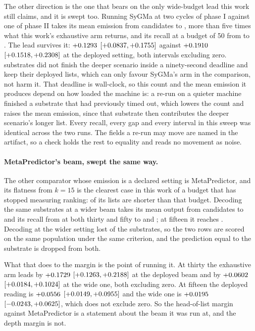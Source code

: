 \documentclass[journal=jcisd8,manuscript=suppinfo,layout=onecolumn]{achemso}
\begin{document}
The other direction is the one that bears on the only wide-budget lead this work still claims, and
it is swept too. Running SyGMa at two cycles of phase I against one of phase II takes its mean
emission from \numSygscenDeployedemitted{} candidates to \numSygscenDeepemitted{}, more than five
times what this work's exhaustive arm returns, and its recall at a budget of 50 from
\numSweepSygmaFiveZero{} to \numSygscenDeeprecall. The lead survives it:
$+0.1293$ $[+0.0837, +0.1755]$ against
$+0.1910$ $[+0.1518, +0.2308]$ at the deployed
setting, both intervals excluding zero. \numSygscenUnfinished{} substrates did not finish the
deeper scenario inside a ninety-second deadline and keep their deployed lists, which can only
favour SyGMa's arm in the comparison, not harm it. That deadline is wall-clock, so this
count and the mean emission it produces depend on how loaded the machine is: a re-run on a quieter
machine finished a substrate that had previously timed out, which lowers the count and raises the
mean emission, since that substrate then contributes the deeper scenario's longer list. Every
recall, every gap and every interval in this sweep was identical across the two runs. The fields a
re-run may move are named in the artifact, so a check holds the rest to equality and
reads no movement as noise.

\paragraph{MetaPredictor's beam, swept the same way.} The other comparator whose emission is a
declared setting is MetaPredictor, and its flatness from $k=15$ is the clearest case in this work of
a budget that has stopped measuring ranking: \numShortMetapredictorOneFive{} of its
\numPopulationN{} lists are shorter than that budget. Decoding the same substrates at a wider beam
takes its mean output from \numMpbeamDeployedemitted{} candidates to \numMpbeamWideemitted{} and
its recall from \numSweepMetapredictorThreeZero{} at both thirty and fifty to
\numMpbeamWiderecallThreeZero{} and \numMpbeamWiderecallFiveZero{}; at fifteen it reaches
\numMpbeamWiderecallOneFive{}. Decoding at the wider setting lost \numMpbeamWidemissingWord{} of the
substrates, so the two rows are scored on the same population under the same criterion, and the
prediction equal to the substrate is dropped from both.

What that does to the margin is the point of running it. At thirty the exhaustive arm leads by
$+0.1729$ $[+0.1263,
+0.2188]$ at the deployed beam and by $+0.0602$
$[+0.0184, +0.1024]$ at the wide one, both excluding zero.
At fifteen the deployed reading is $+0.0556$
$[+0.0149, +0.0955]$ and the wide one is
$+0.0195$ $[-0.0243, +0.0625]$, which does not
exclude zero. So the head-of-list margin against MetaPredictor is a statement about the beam it was
run at, and the depth margin is not.
\end{document}
